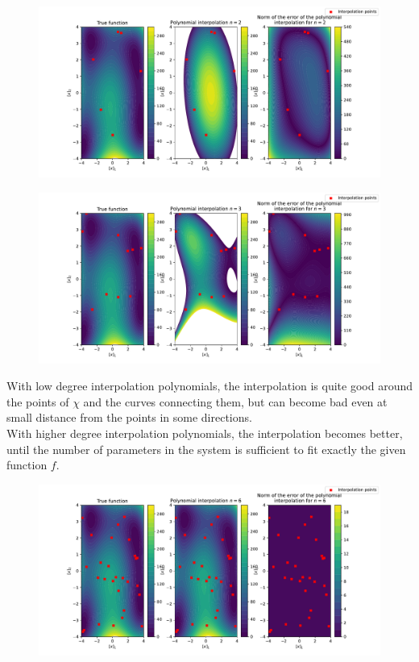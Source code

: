 \documentclass[11pt]{article}
\begin{document}
\begin{tcolorbox}[breakable,
                  colback=white,
                  colframe=white!75!black,
                  title={For several values of \(n\ge0\), generate sets \(\chi_n\subset\mathbb{R}^n\) so that the polynomial interpolation of degree $n$ is well-posed (you can do this heuristically and check the sufficient condition numerically). For each value of $n$, show the interpolation of $f(x)$ with degree $n$ and the interpolation set $\chi_n$.}
                 ]
    \begin{figure}[H]
        \centering
        \includegraphics[width=0.7\linewidth]{homework1/polynomial_interpolation_2.pdf}
    \end{figure}
    \begin{figure}[H]
        \centering
        \includegraphics[width=0.7\linewidth]{homework1/polynomial_interpolation_3.pdf}
    \end{figure}
    With low degree interpolation polynomials, the interpolation is quite good around the points of \(\chi\) and the curves connecting them, but can become bad even at small distance from the points in some directions.\\
    With higher degree interpolation polynomials, the interpolation becomes better, until the number of parameters in the system is sufficient to fit exactly the given function \(f\).
    \begin{figure}[H]
        \centering
        \includegraphics[width=0.7\linewidth]{homework1/polynomial_interpolation_6.pdf}
    \end{figure}
\end{tcolorbox}
\end{document}

